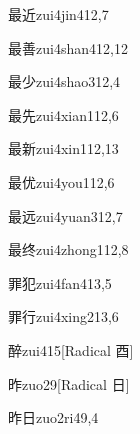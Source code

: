 \begin{verbete}{最近}{zui4jin4}{12,7}
\end{verbete}

\begin{verbete}{最善}{zui4shan4}{12,12}
\end{verbete}

\begin{verbete}{最少}{zui4shao3}{12,4}
\end{verbete}

\begin{verbete}{最先}{zui4xian1}{12,6}
\end{verbete}

\begin{verbete}{最新}{zui4xin1}{12,13}
\end{verbete}

\begin{verbete}{最优}{zui4you1}{12,6}
\end{verbete}

\begin{verbete}{最远}{zui4yuan3}{12,7}
\end{verbete}

\begin{verbete}{最终}{zui4zhong1}{12,8}
\end{verbete}

\begin{verbete}{罪犯}{zui4fan4}{13,5}
\end{verbete}

\begin{verbete}{罪行}{zui4xing2}{13,6}
\end{verbete}

\begin{verbete}{醉}{zui4}{15}[Radical 酉]
\end{verbete}

\begin{verbete}{昨}{zuo2}{9}[Radical 日]
\end{verbete}

\begin{verbete}{昨日}{zuo2ri4}{9,4}
\end{verbete}

